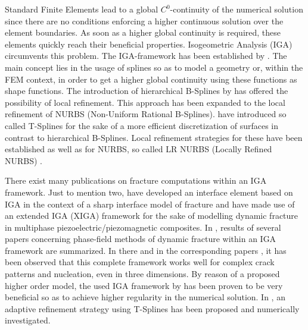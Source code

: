 Standard Finite Elements lead to a global $C^{0}$-continuity of the numerical solution since there are no conditions enforcing a higher continuous solution over the element boundaries. As soon as a higher global continuity is required, these elements quickly reach their beneficial properties. Isogeometric Analysis (IGA) circumvents this problem. The IGA-framework has been established by \citet{09_B_IGA1}. The main concept lies in the usage of splines so as to model a geometry or, within the FEM context, in order to get a higher global continuity using these functions as shape functions. The introduction of hierarchical B-Splines by \citet{18_IGA_HierBSplines} has offered the possibility of local refinement. This approach has been expanded to the local refinement of NURBS (Non-Uniform Rational B-Splines). \citet{16_IGA_TSplines} have introduced so called T-Splines for the sake of a more efficient discretization of surfaces in contrast to hierarchical B-Splines. Local refinement strategies for these have been established as well as for NURBS, so called LR NURBS (Locally Refined NURBS) \cite{17_IGA_LRNURBS}.

There exist many publications on fracture computations within an IGA framework. Just to mention two, \citet{19_B_FracIGA1} have developed an interface element based on IGA in the context of a sharp interface model of fracture and \citet{20_B_FracIGA2} have made use of an extended IGA (XIGA) framework for the sake of modelling dynamic fracture in multiphase piezoelectric/piezomagnetic composites. In \cite{11_PF_DissBorden}, results of several papers concerning phase-field methods of dynamic fracture within an IGA framework are summarized. In there and in the corresponding papers \cite{03_PF_ductile}\cite{02_PF_HO_brittle}\cite{01_PF_dyn_brittle}, it has been observed that this complete framework works well for complex crack patterns and nucleation, even in three dimensions. By reason of a proposed higher order model, the used IGA framework by \citet{09_B_IGA1} has been proven to be very beneficial so as to achieve higher regularity in the numerical solution. In \cite{01_PF_dyn_brittle}, an adaptive refinement strategy using T-Splines has been proposed and numerically investigated.

